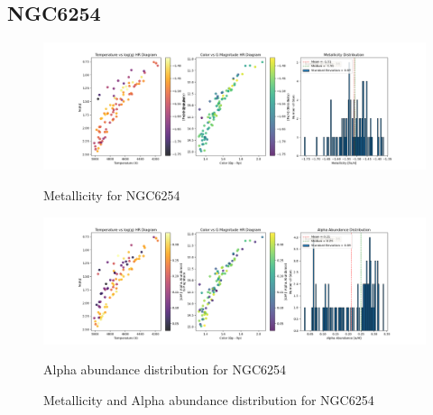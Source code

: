 \documentclass[a4paper,12pt]{article}
\begin{document}
\subsection{NGC6254}
\begin{figure}[H]
    \centering
    \begin{minipage}[b]{0.8\textwidth}
        \centering
        \includegraphics[width=\textwidth]{NGC6254_metalicity.png}
        \caption{Metallicity for NGC6254}
        \label{fig:NGC6254_metalicity}
    \end{minipage}
    \hfill
    \begin{minipage}[b]{0.8\textwidth}
        \centering
        \includegraphics[width=\textwidth]{NGC6254_alpha.png}
        \caption{Alpha abundance distribution for NGC6254}
        \label{fig:NGC6254_alpha}
    \end{minipage}
    \caption{Metallicity and Alpha abundance distribution for NGC6254}
    \label{fig:NGC6254_combined}
\end{figure}
\clearpage
\end{document}

